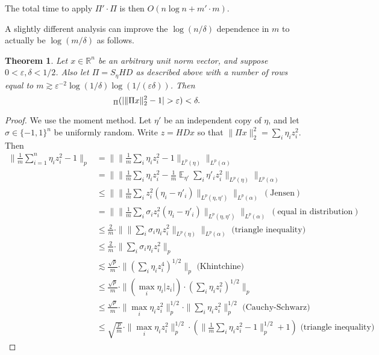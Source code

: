 \documentclass[11pt]{article}
\DeclareMathOperator*{\E}{\mathbb{E}}
\let\Pr\relax
\DeclareMathOperator*{\Pr}{\mathbb{P}}
\newcommand{\eps}{\varepsilon}
\newcommand{\R}{\mathbb{R}}
\newcommand{\EquationName}[1]{\label{eq:#1}}
\newtheorem{theorem}{Theorem}
\begin{document}
The total time to apply $\Pi'\cdot \Pi$ is then $O(n\log n + m' \cdot m)$. 

A slightly different analysis can improve the $\log(n/\delta)$ dependence in $m$ to actually be $\log(m/\delta)$ as follows. 

\begin{theorem}\label{thm:fjlt}
Let $x\in\R^n$ be an arbitrary unit norm vector, and suppose $0 < \eps, \delta < 1/2$. Also let $\Pi = S_\eta H D$ as described above with a number of rows equal to $m\gtrsim \eps^{-2}\log(1/\delta)\log(1/(\eps\delta))$. Then
$$
\Pr_\Pi(| \|\Pi x\|_2^2 - 1 | > \eps ) < \delta .
$$
\end{theorem}
\begin{proof}
We use the moment method. Let $\eta'$ be an independent copy of $\eta$, and let $\sigma\in\{-1,1\}^n$ be uniformly random. Write $z = HDx$ so that $\|\Pi x\|_2^2 = \sum_i \eta_i z_i^2$. Then
\allowdisplaybreaks
\begin{align}
\|\frac 1m\sum_{i=1}^n \eta_i z_i^2 - 1\|_p &= \|\|\frac 1m\sum_i \eta_i z_i^2 - 1\|_{L^p(\eta)}\|_{L^p(\alpha)} \EquationName{sqrtfjlt1}\\
\nonumber {}  &= \|\|\frac 1m\sum_i \eta_i z_i^2 - \frac 1m\E_{\eta'} \sum_i \eta'_i z_i^2\|_{L^p(\eta)}\|_{L^p(\alpha)}\\
\nonumber {}  &\le \|\|\frac 1m\sum_i z_i^2 (\eta_i - \eta'_i)\|_{L^p(\eta,\eta')}\|_{L^p(\alpha)}\ (\text{Jensen})\\
\nonumber {}  &= \|\|\frac 1m\sum_i \sigma_iz_i^2 (\eta_i - \eta'_i)\|_{L^p(\eta,\eta')}\|_{L^p(\alpha)}\ (\text{equal in distribution})\\
\nonumber {} &\le \frac 2m\cdot \|\|\sum_i \sigma_i \eta_i z_i^2\|_{L^p(\eta)}\|_{L^p(\alpha)}\text{ (triangle inequality)}\\
\nonumber {} &\le \frac 2m\cdot \|\sum_i \sigma_i \eta_i z_i^2\|_p\\
\nonumber {}&\lesssim \frac{\sqrt{p}}m\cdot \|(\sum_i \eta_i z_i^4)^{1/2}\|_p \text{ (Khintchine)}\\
\nonumber {}&\le \frac{\sqrt{p}}m\cdot \|(\max_i \eta_i |z_i|) \cdot (\sum_i \eta_i z_i^2)^{1/2}\|_p\\
\nonumber {}&\le \frac{\sqrt{p}}m\cdot \|\max_i \eta_i z_i^2\|_p^{1/2} \cdot \|\sum_i \eta_i z_i^2\|_p^{1/2}\text{ (Cauchy-Schwarz)}\\
{}&\le \sqrt{\frac pm} \cdot \|\max_i \eta_i z_i^2\|_p^{1/2} \cdot (\|\frac 1m\sum_i \eta_i z_i^2 - 1\|_p^{1/2} + 1)\text{ (triangle inequality)} \EquationName{sqrtfjlt2}
\end{align}


\end{proof}
\end{document}
